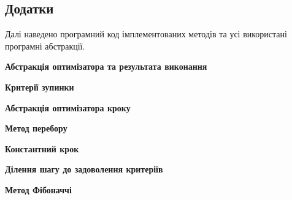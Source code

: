 \begin{center}
    \section*{Додатки}
\end{center}



Далі наведено програмний код імплементованих методів
та усі використані програмні абстракції.

\vspace{0.25cm}
\noindent \textbf{Абстракція оптимізатора та результата виконання}



\vspace{0.5cm}
\noindent \textbf{Критерії зупинки}



\vspace{0.5cm}
\noindent \textbf{Абстракція оптимізатора кроку}



\vspace{0.5cm}
\noindent \textbf{Метод перебору}



\vspace{0.5cm}
\noindent \textbf{Константний крок}



\vspace{0.5cm}
\noindent \textbf{Ділення шагу до задоволення критеріїв}




\vspace{0.5cm}
\noindent \textbf{Метод Фібоначчі}

